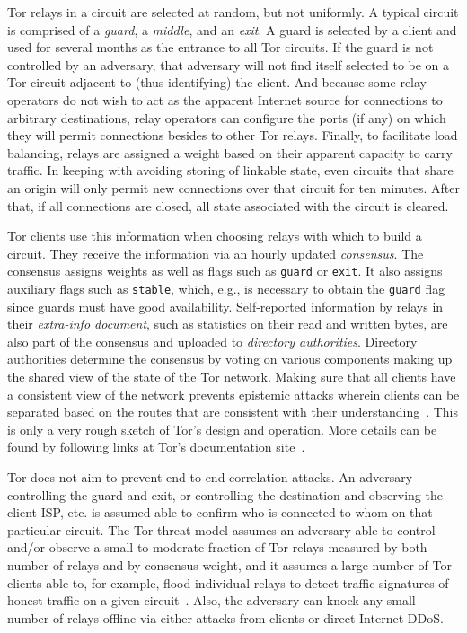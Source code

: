 Tor relays in a circuit are selected at random, but not uniformly. A typical
circuit is comprised of a \emph{guard}, a \emph{middle}, and an \emph{exit}. A
guard is selected by a client and used for several months as the entrance to all
Tor circuits. If the guard is not controlled by an adversary, that adversary
will not find itself selected to be on a Tor circuit adjacent to (thus
identifying) the client. And because some relay operators do not wish to act as
the apparent Internet source for connections to arbitrary destinations, relay
operators can configure the ports (if any) on which they will permit connections
besides to other Tor relays. Finally, to facilitate load balancing, relays are
assigned a weight based on their apparent capacity to carry traffic. In keeping
with avoiding storing of linkable state, even circuits that share an origin will
only permit new connections over that circuit for ten minutes. After that, if
all connections are closed, all state associated with the circuit is cleared.

Tor clients use this information when choosing relays with which to build a
circuit. They receive the information via an hourly updated \emph{consensus}.
The consensus assigns weights as well as flags such as \texttt{guard} or
\texttt{exit}. It also assigns auxiliary flags such as
\texttt{stable}, which, e.g.,
is necessary to obtain the \texttt{guard} flag since guards must have good
availability. Self-reported information by relays in their \emph{extra-info
document}, such as statistics on their read and written bytes, are also part of
the consensus and uploaded to \emph{directory authorities}. Directory
authorities determine the consensus by voting on various components making up
the shared view of the state of the Tor network. Making sure that all clients
have a consistent view of the network prevents epistemic attacks wherein clients
can be separated based on the routes that are consistent with their
understanding~\cite{danezis:pets2008}. This is only a very rough sketch of Tor's
design and operation.  More details can be found by following links at Tor's
documentation site~\cite{tor-documentation}.

Tor does not aim to prevent end-to-end correlation attacks. An adversary
controlling the guard and exit, or controlling the destination and observing the
client ISP, etc. is assumed able to confirm who is connected to whom on that
particular circuit. The Tor threat model assumes an adversary able to control
and/or observe a small to moderate fraction of Tor relays measured by both
number of relays and by consensus weight, and it assumes a large
number of Tor clients
able to, for example, flood individual relays to detect traffic signatures of
honest traffic on a given circuit~\cite{long-paths}. Also, the adversary can
knock any small number of relays offline via either attacks from clients or
direct Internet DDoS. 
